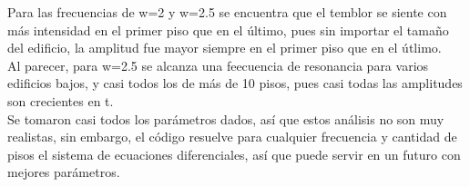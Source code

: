 \documentclass[11pt,letterpaper]{exam}
\begin{document}
Para las frecuencias de w=2 y w=2.5 se encuentra que el temblor se siente con más intensidad en el primer piso que en el último, pues sin importar el tamaño del edificio, la amplitud fue mayor siempre en el primer piso que en el útlimo.\\
Al parecer, para w=2.5 se alcanza una feecuencia de resonancia para varios edificios bajos, y casi todos los de más de 10 pisos, pues casi todas las amplitudes son crecientes en t.\\
Se tomaron casi todos los parámetros dados, así que estos análisis no son muy realistas, sin embargo, el código resuelve para cualquier frecuencia y cantidad de pisos el sistema de ecuaciones diferenciales, así que puede servir en un futuro con mejores parámetros.
\end{document}
